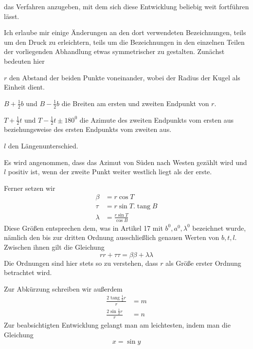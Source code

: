 %
das Verfahren anzugeben, mit dem sich diese Entwicklung beliebig weit fortführen lässt.

Ich erlaube mir einige Änderungen an den dort verwendeten Bezeichnungen, teils um den Druck zu erleichtern, teils um die Bezeichnungen in den einzelnen Teilen der vorliegenden Abhandlung etwas symmetrischer zu gestalten. Zunächst bedeuten hier
\begin{list}{}{\setlength{\leftmargin}{1.4em}\setlength{\itemindent}{-1.4em}\setlength{\itemsep}{0pt}\setlength{\parsep}{0pt}}
\item \(r\) den Abstand der beiden Punkte voneinander, wobei der Radius der Kugel als Einheit dient.
\item \(B+\frac12b\) und \(B-\frac12b\) die Breiten am ersten und zweiten Endpunkt von \(r\).
\item \(T+\frac12t\) und \(T-\frac12t\pm180^0\) die Azimute des zweiten Endpunkts vom ersten aus beziehungsweise des ersten Endpunkts vom zweiten aus.
\item \(l\) den Längenunterschied.
\end{list}
\noindent Es wird angenommen, dass das Azimut von Süden nach Westen gezählt wird und \(l\) positiv ist, wenn der zweite Punkt weiter westlich liegt als der erste.

Ferner setzen wir
\[
\begin{aligned}
\beta&=r\cos T\\
\tau&=r\sin T\mathord{.}\operatorname{tang}B\\
\lambda&=\frac{r\sin T}{\cos B}
\end{aligned}
\]
Diese Größen entsprechen dem, was in Artikel 17 mit \(b^0,a^0,\lambda^0\) bezeichnet wurde, nämlich den bis zur dritten Ordnung ausschließlich genauen Werten von \(b,t,l\). Zwischen ihnen gilt die Gleichung
\[
rr+\tau\tau=\beta\beta+\lambda\lambda
\]
Die Ordnungen sind hier stets so zu verstehen, dass \(r\) als Größe erster Ordnung betrachtet wird.

\indent Zur Abkürzung schreiben wir außerdem
\[
\begin{aligned}
\frac{2\operatorname{tang}\frac12r}{r}&=m\\
\frac{2\sin\frac12r}{r}&=n
\end{aligned}
\]
Zur beabsichtigten Entwicklung gelangt man am leichtesten, indem man die Gleichung
\[
x=\sin y
\]
